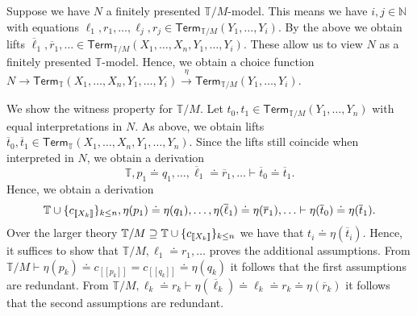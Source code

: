 \documentclass[10pt,a4paper]{article}
\theoremstyle{definition}
\theoremstyle{remark}
\newcommand{\nats}{\mathbb{N}}
\DeclarePairedDelimiter\set{\{}{\}}
\newcommand\Term{\mathsf{Term}}
\newcommand\bbT{\mathbb{T}}
\begin{document}
Suppose we have \(N\) a finitely presented \(\bbT/M\)-model.
This means we have \(i, j \in \nats\) with equations \(\ell_1, r_1, \ldots, \ell_j, r_j \in \Term_{\bbT/M}(Y_1, \ldots, Y_i)\).
By the above we obtain lifts \(\overline\ell_1, \overline r_1, \ldots \in \Term_{\bbT/M}(X_1, \ldots, X_n, Y_1, \ldots, Y_i)\).
These allow us to view \(N\) as a finitely presented \(\bbT\)-model.
Hence, we obtain a choice function \(N \to \Term_{\bbT}(X_1, \ldots, X_n, Y_1, \ldots, Y_i) \xrightarrow{\eta} \Term_{\bbT/M}(Y_1, \ldots, Y_i)\).

We show the witness property for \(\bbT/M\).
Let \(t_0, t_1 \in \Term_{\bbT/M}(Y_1, \ldots, Y_n)\) with equal interpretations in \(N\).
As above, we obtain lifts \(\overline t_0, \overline t_1 \in \Term_{\bbT}(X_1, \ldots, X_n, Y_1, \ldots, Y_n)\).
Since the lifts still coincide when interpreted in \(N\), we obtain a derivation
\[
  \bbT, p_1 \doteq q_1, \ldots, \overline\ell_1 \doteq \overline r_1, \ldots \vdash \overline t_0 \doteq \overline  t_1.
\]
Hence, we obtain a derivation
\[
  \bbT \cup \set{ c_{[\![X_k]\!]} }_{k \leq n}, \eta(p_1) \doteq \eta(q_1), \ldots, \eta(\overline \ell_1) \doteq \eta (\overline r_1), \ldots \vdash \eta (\overline t_0) \doteq \eta (\overline t_1).
\]
Over the larger theory \(\bbT/M \supseteq \bbT \cup \set{ c_{[\![X_k]\!]} }_{k \leq n}\) we have that \(t_i \doteq \eta(\overline{t}_i)\).
Hence, it suffices to show that \(\bbT/M, \ell_1 \doteq r_1, \ldots\) proves the additional assumptions.
From \(\bbT/M \vdash \eta(p_k) \doteq c_{[\![p_k]\!]} = c_{[\![q_k]\!]} \doteq \eta(q_k)\) it follows that the first assumptions are redundant.
From \(\bbT/M, \ell_k \doteq r_k \vdash \eta(\overline\ell_k) \doteq \ell_k \doteq r_k \doteq \eta(\overline{r}_k)\) it follows that the second assumptions are redundant.
\end{document}
